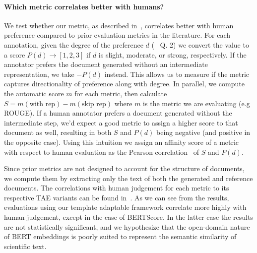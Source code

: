 \paragraph{Which metric correlates better with humans?} We test whether our metric, as described in~, correlates better with human preference compared to prior evaluation metrics in the literature.
For each annotation, given the degree of the preference $d$ (~ Q. 2) we convert the value to a score $P(d) \rightarrow [1,2,3]$ if $d$ is slight, moderate, or strong, respectively. 
If the annotator prefers the document generated without an intermediate representation, we take $-P(d)$ instead. This allows us to measure if the metric captures directionality of preference along with degree. In parallel, we compute the automatic score $m$ for each metric, then calculate
$S =m(\textrm{with rep}) - m(\textrm{skip rep})$
where $m$ is the metric we are evaluating (e.g ROUGE). If a human annotator prefers a document generated without the intermediate step, we'd expect a good metric to assign a higher score to that document as well, resulting in both $S$ and $P(d)$ being negative (and positive in the opposite case). %
Using this intuition we assign an affinity score of a metric with respect to human evaluation as the Pearson correlation~\cite{PearsonVIINO} of $S$ and $P(d)$.

Since prior metrics are not designed to account for the structure of documents, we compute them by extracting only the text of both the generated and reference documents. The correlations with human judgement for each metric to its respective TAE variants can be found in~. As we can see from the results, evaluations using our template adaptable framework correlate more highly with human judgement, except in the case of BERTScore. In the latter case the results are not statistically significant, and we hypothesize that the open-domain nature of BERT embeddings is poorly suited to represent the semantic similarity of scientific text.


